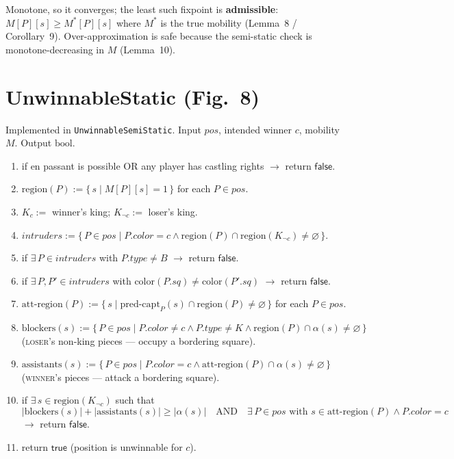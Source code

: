 \documentclass[11pt]{article}
\newcommand{\code}[1]{\texttt{#1}}
\theoremstyle{plain}
\theoremstyle{definition}
\newcommand{\pos}{\mathit{pos}}
\newcommand{\sq}{\mathit{sq}}
\newcommand{\predcaptP}{\mathrm{pred\text{-}capt}_P}
\newcommand{\region}{\mathrm{region}}
\newcommand{\attregion}{\mathrm{att\text{-}region}}
\newcommand{\blockers}{\mathrm{blockers}}
\newcommand{\assistants}{\mathrm{assistants}}
\newcommand{\true}{\ensuremath{\mathsf{true}}}
\newcommand{\false}{\ensuremath{\mathsf{false}}}
\begin{document}
Monotone, so it converges; the least such fixpoint is \textbf{admissible}: $M[P][s] \ge M^*[P][s]$ where $M^*$ is the
true mobility (Lemma~8 / Corollary~9). Over-approximation is safe because the semi-static check is monotone-decreasing
in $M$ (Lemma~10).

\section{UnwinnableStatic (Fig.~8)}

Implemented in \code{UnwinnableSemiStatic}. Input $\pos$, intended winner $c$, mobility $M$. Output $\mathrm{bool}$.

\begin{enumerate}[leftmargin=2.6em,label=\arabic*.]
  \item if en passant is possible OR any player has castling rights $\rightarrow$ return \false.
  \item $\region(P) := \{\, s \mid M[P][s] = 1 \,\}$ \quad for each $P \in \pos$.
  \item $K_c :=$ winner's king; \quad $K_{\neg c} :=$ loser's king.
  \item $\mathit{intruders} := \{\, P \in \pos \mid P.\mathit{color} = c \land \region(P) \cap \region(K_{\neg c}) \ne \varnothing \,\}$.
  \item if $\exists\, P \in \mathit{intruders}$ with $P.\mathit{type} \ne B$ $\rightarrow$ return \false.
  \item if $\exists\, P,P' \in \mathit{intruders}$ with $\mathrm{color}(P.\sq) \ne \mathrm{color}(P'.\sq)$ $\rightarrow$ return \false.
  \item $\attregion(P) := \{\, s \mid \predcaptP(s) \cap \region(P) \ne \varnothing \,\}$ \quad for each $P \in \pos$.
  \item $\blockers(s) := \{\, P \in \pos \mid P.\mathit{color} \ne c \land P.\mathit{type} \ne K \land \region(P) \cap \alpha(s) \ne \varnothing \,\}$ \\ (\textsc{loser}'s non-king pieces --- occupy a bordering square).
  \item $\assistants(s) := \{\, P \in \pos \mid P.\mathit{color} = c \land \attregion(P) \cap \alpha(s) \ne \varnothing \,\}$ \\ (\textsc{winner}'s pieces --- attack a bordering square).
  \item if $\exists\, s \in \region(K_{\neg c})$ such that
    \[
      |\blockers(s)| + |\assistants(s)| \ge |\alpha(s)| \quad\text{AND}\quad \exists\, P \in \pos \text{ with } s \in \attregion(P) \land P.\mathit{color} = c
    \]
    $\rightarrow$ return \false.
  \item return \true{} \quad (position is unwinnable for $c$).
\end{enumerate}
\end{document}
